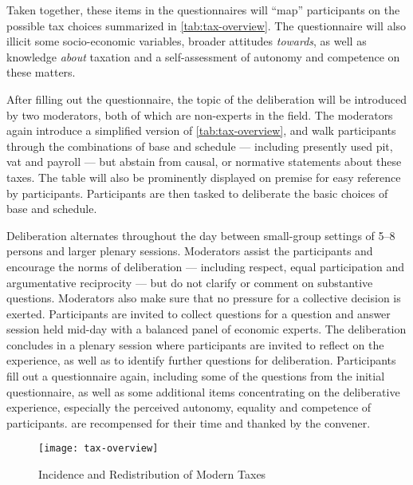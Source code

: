 Taken together, these items in the questionnaires will ``map'' participants on the possible tax choices summarized in \autoref{tab:tax-overview}.
The questionnaire will also illicit some socio-economic variables, broader attitudes \emph{towards}, as well as knowledge \emph{about} taxation and a self-assessment of autonomy and competence on these matters.

After filling out the questionnaire, the topic of the deliberation will be introduced by two moderators, both of which are non-experts in the field.
The moderators again introduce a simplified version of \autoref{tab:tax-overview}, and walk participants through the combinations of base and schedule --- including presently used \gls{pit}, \gls{vat} and \gls{payroll} --- but abstain from causal, or normative statements about these taxes.
The table will also be prominently displayed on premise for easy reference by participants.
Participants are then tasked to deliberate the basic choices of base and schedule.

Deliberation alternates throughout the day between small-group settings of 5--8 persons and larger plenary sessions.
Moderators assist the participants and encourage the norms of deliberation --- including respect, equal participation and argumentative reciprocity --- but do not clarify or comment on substantive questions.
Moderators also make sure that no pressure for a collective decision is exerted.
Participants are invited to collect questions for a question and answer session held mid-day with a balanced panel of economic experts.
The deliberation concludes in a plenary session where participants are invited to reflect on the experience, as well as to identify further questions for deliberation.
Participants fill out a questionnaire again, including some of the questions from the initial questionnaire, as well as some additional items concentrating on the deliberative experience, especially the perceived autonomy, equality and competence of participants.
 are recompensed for their time and thanked by the convener.


\begin{landscape}
 \begin{figure}[htbp]
    \begin{center}
	\texttt{[image: tax-overview]}
	\caption{Incidence and Redistribution of Modern Taxes}
	\label{tab:tax-overview}
	\end{center}
	
\end{figure}
\end{landscape}

